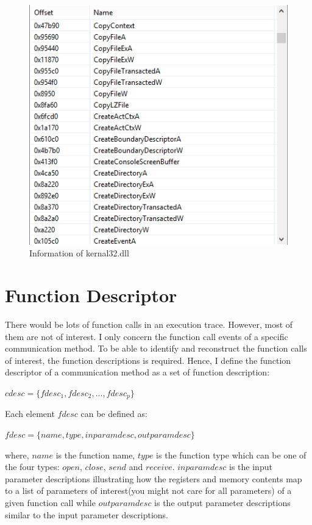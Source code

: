 \begin{figure}[H]
\centerline{\includegraphics[scale=0.6]{Figures/executable}}
\caption{Information of kernal32.dll}
\label{executable}
\end{figure}

\section{Function Descriptor}\label{cdesc}
There would be lots of function calls in an execution trace. However, most of them are not of interest. I only concern the function call events of a specific communication method. To be able to identify and reconstruct the function calls of interest, the function descriptions is required. Hence, I define the function descriptor of a communication method as a set of function description:

$cdesc = \lbrace fdesc_1, fdesc_2,...,fdesc_p \rbrace$

Each element $fdesc$ can be defined as:

$fdesc = \lbrace name, type, inparamdesc, outparamdesc \rbrace$

where, $name$ is the function name, $type$ is the function type which can be one of the four types: $open$, $close$, $send$ and $receive$. $inparamdesc$ is the input parameter descriptions illustrating how the registers and memory contents map to a list of parameters of interest(you might not care for all parameters) of a given function call while $outparamdesc$ is the output parameter descriptions similar to the input parameter descriptions. 


